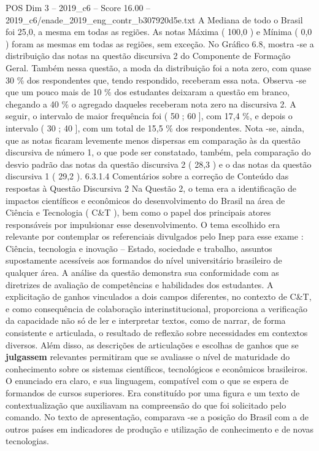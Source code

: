 \begin{textsample}{POS Dim 3 – 2019\_c6 – Score 16.00 – 2019\_c6/enade\_2019\_eng\_contr\_b307920d5e.txt}
A Mediana de todo o Brasil foi 25,0, a mesma em todas as regiões.
As notas Máxima ( 100,0 ) e Mínima ( 0,0 ) foram as mesmas em todas as regiões, sem exceção.
No Gráfico 6.8, mostra -se a distribuição das notas na questão discursiva 2 do Componente de Formação Geral.
Também nessa questão, a moda da distribuição foi a nota zero, com quase 30 \% dos respondentes que, tendo respondido, receberam essa nota.
Observa -se que um pouco mais de 10 \% dos estudantes deixaram a questão em branco, chegando a 40 \% o agregado daqueles receberam nota zero na discursiva 2.
A seguir, o intervalo de maior frequência foi ( 50 ; 60 ], com 17,4 \%, e depois o intervalo ( 30 ; 40 ], com um total de 15,5 \% dos respondentes.
Nota -se, ainda, que as notas ficaram levemente menos dispersas em comparação às da questão discursiva de número 1, o que pode ser constatado, também, pela comparação do desvio padrão das notas da questão discursiva 2 ( 28,3 ) e o das notas da questão discursiva 1 ( 29,2 ). 6.3.1.4 Comentários sobre a correção de Conteúdo das respostas à Questão Discursiva 2 Na Questão 2, o tema era a identificação de impactos científicos e econômicos do desenvolvimento do Brasil na área de Ciência e Tecnologia ( C\&T ), bem como o papel dos principais atores responsáveis por impulsionar esse desenvolvimento.
O tema escolhido era relevante por contemplar os referenciais divulgados pelo Inep para esse exame : Ciência, tecnologia e inovação – Estado, sociedade e trabalho, assuntos supostamente acessíveis aos formandos do nível universitário brasileiro de qualquer área.
A análise da questão demonstra sua conformidade com as diretrizes de avaliação de competências e habilidades dos estudantes.
A explicitação de ganhos vinculados a dois campos diferentes, no contexto de C\&T, e como consequência de colaboração interinstitucional, proporciona a verificação da capacidade não só de ler e interpretar textos, como de narrar, de forma consistente e articulada, o resultado de reflexão sobre necessidades em contextos diversos.
Além disso, as descrições de articulações e escolhas de ganhos que se \textbf{julgassem} relevantes permitiram que se avaliasse o nível de maturidade do conhecimento sobre os sistemas científicos, tecnológicos e econômicos brasileiros.
O enunciado era claro, e sua linguagem, compatível com o que se espera de formandos de cursos superiores.
Era constituído por uma figura e um texto de contextualização que auxiliavam na compreensão do que foi solicitado pelo comando.
No texto de apresentação, comparava -se a posição do Brasil com a de outros países em indicadores de produção e utilização de conhecimento e de novas tecnologias.

\end{textsample}
